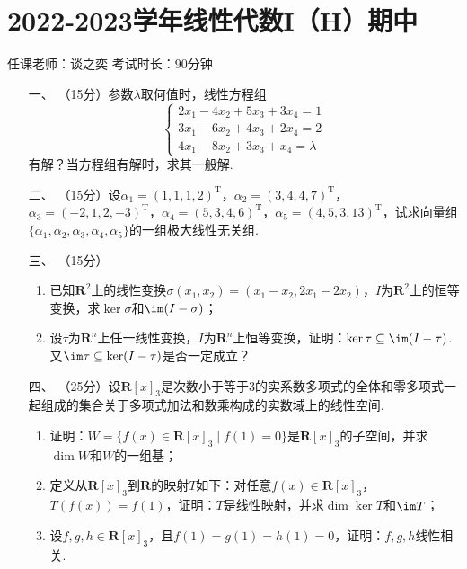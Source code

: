 \section*{2022-2023学年线性代数I（H）期中}

\begin{center}
    任课老师：谈之奕\hspace{4em} 考试时长：90分钟
\end{center}
\begin{enumerate}
	\item[一、]（15分）参数$\lambda$取何值时，线性方程组
	\[\begin{cases}
        2x_1-4x_2+5x_3+3x_4=1 \\
        3x_1-6x_2+4x_3+2x_4=2 \\
        4x_1-8x_2+3x_3+x_4=\lambda
    \end{cases}\]
    有解？当方程组有解时，求其一般解.
	\item[二、]（15分）设$\alpha_1=(1,1,1,2)^\mathrm{T}$，$\alpha_2=(3,4,4,7)^\mathrm{T}$，$\alpha_3=(-2,1,2,-3)^\mathrm{T}$，$\alpha_4=(5,3,4,6)^\mathrm{T}$，$\alpha_5=(4,5,3,13)^\mathrm{T}$，试求向量组$\{\alpha_1,\alpha_2,\alpha_3,\alpha_4,\alpha_5\}$的一组极大线性无关组.
	\item[三、]（15分）
    \begin{enumerate}[label=(\arabic*)]
        \item 已知$\mathbf{R}^2$上的线性变换$\sigma(x_1,x_2)=(x_1-x_2,2x_1-2x_2)$，$I$为$\mathbf{R}^2$上的恒等变换，求$\ker\sigma$和$\im(I-\sigma)$；
        \item 设$\tau$为$\mathbf{R}^n$上任一线性变换，$I$为$\mathbf{R}^n$上恒等变换，证明：$\ker\tau\subseteq\im(I-\tau)$.又$\im\tau\subseteq\ker(I-\tau)$是否一定成立？
    \end{enumerate}
	\item[四、]（25分）设$\mathbf{R}[x]_3$是次数小于等于3的实系数多项式的全体和零多项式一起组成的集合关于多项式加法和数乘构成的实数域上的线性空间.
	\begin{enumerate}[label=(\arabic*)]
        \item 证明：$W=\{f(x)\in\mathbf{R}[x]_3\mid f(1)=0\}$是$\mathbf{R}[x]_3$的子空间，并求$\dim W$和$W$的一组基；
        \item 定义从$\mathbf{R}[x]_3$到$\mathbf{R}$的映射$T$如下：对任意$f(x)\in\mathbf{R}[x]_3$，$T(f(x))=f(1)$，证明：$T$是线性映射，并求$\dim\ker T$和$\im T$；
        \item 设$f,g,h\in\mathbf{R}[x]_3$，且$f(1)=g(1)=h(1)=0$，证明：$f,g,h$线性相关.

\end{enumerate}
\end{enumerate}
